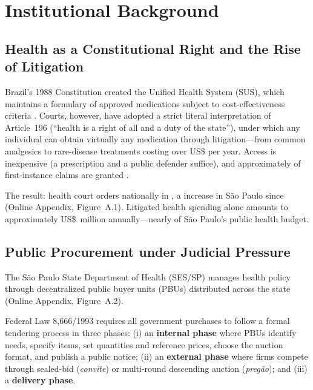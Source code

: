 \section{Institutional Background}
\label{sec:institutional}

\subsection{Health as a Constitutional Right and the Rise of Litigation}
\label{sec:health_right}

Brazil's 1988 Constitution created the Unified Health System (SUS), which maintains a formulary of approved medications subject to cost-effectiveness criteria \citep{castro2019, soares2019}. Courts, however, have adopted a strict literal interpretation of Article~196 (``health is a right of all and a duty of the state''), under which any individual can obtain virtually any medication through litigation---from common analgesics to rare-disease treatments costing over US\$\BPrareDrugCostUSD{} per year. Access is inexpensive (a prescription and a public defender suffice), and approximately \BPlitGrantedShare{} of first-instance claims are granted \citep{cnj2019judicializacao}.

The result: \BPlitClaimsBR{} health court orders nationally in \BPcnjClaimsYear, a \BPspGrowthSince{} increase in S\~ao Paulo since \BPspGrowthBaseYear{} (Online Appendix, Figure~A.1). Litigated health spending alone amounts to approximately US\$\BPlitSpendingUSDmm~million annually---nearly \BPlitSpendingShare{} of S\~ao Paulo's public health budget.

\subsection{Public Procurement under Judicial Pressure}
\label{sec:procurement_pressure}

The S\~ao Paulo State Department of Health (SES/SP) manages health policy through \BPpbuCount{} decentralized public buyer units (PBUs) distributed across the state (Online Appendix, Figure~A.2).

Federal Law 8,666/1993 requires all government purchases to follow a formal tendering process in three phases: (i) an \textbf{internal phase} where PBUs identify needs, specify items, set quantities and reference prices, choose the auction format, and publish a public notice; (ii) an \textbf{external phase} where firms compete through sealed-bid (\textit{convite}) or multi-round descending auction (\textit{preg\~ao}); and (iii) a \textbf{delivery phase}.

